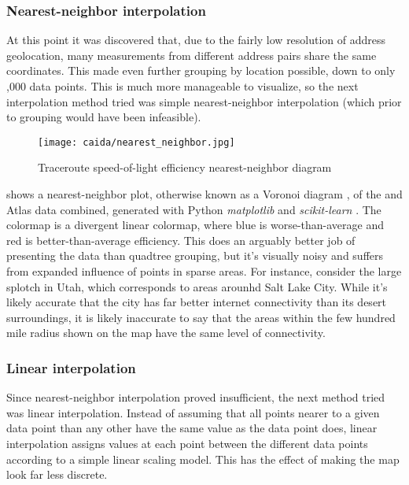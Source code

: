 \subsubsection{Nearest-neighbor interpolation}

At this point it was discovered that, due to the fairly low resolution of \ip address geolocation, many measurements from different \ip address pairs share the same coordinates. This made even further grouping by location possible, down to only ,000 data points. This is much more manageable to visualize, so the next interpolation method tried was simple nearest-neighbor interpolation (which prior to grouping would have been infeasible).

\begin{figure}[htb]
    \centering
    \texttt{[image: caida/nearest\_neighbor.jpg]}
    \caption{Traceroute speed-of-light efficiency nearest-neighbor diagram}
    \label{fig:caida_nearest_neighbor}
\end{figure}

 shows a nearest-neighbor plot, otherwise known as a Voronoi diagram \cite{Malhotra2017a}, of the \caida and \ripe Atlas data combined, generated with Python \textit{matplotlib} and \textit{scikit-learn} \cite{scipy, matplotlib}. The colormap is a divergent linear colormap, where blue is worse-than-average and red is better-than-average efficiency. This does an arguably better job of presenting the data than quadtree grouping, but it's visually noisy and suffers from expanded influence of points in sparse areas. For instance, consider the large splotch in Utah, which corresponds to areas arounhd Salt Lake City. While it's likely accurate that the city has far better internet connectivity than its desert surroundings, it is likely inaccurate to say that the areas within the few hundred mile radius shown on the map have the same level of connectivity.

\subsubsection{Linear interpolation}

Since nearest-neighbor interpolation proved insufficient, the next method tried was linear interpolation. Instead of assuming that all points nearer to a given data point than any other have the same value as the data point does, linear interpolation assigns values at each point between the different data points according to a simple linear scaling model. This has the effect of making the map look far less discrete.

